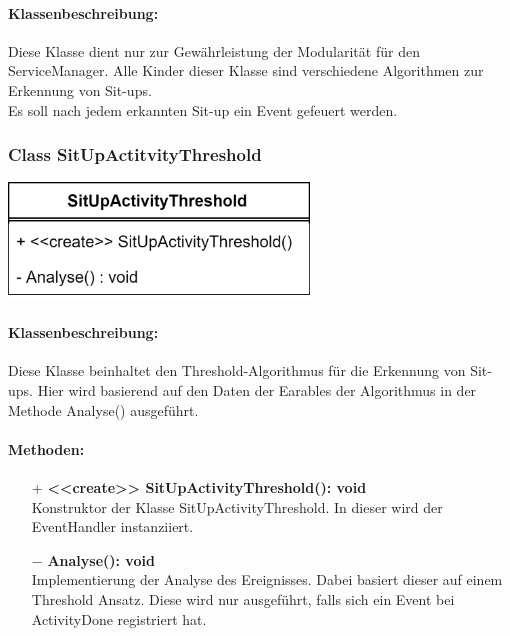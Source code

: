 \documentclass[a4paper,12pt]{article}
\begin{document}
	\paragraph{Klassenbeschreibung:}
	Diese Klasse dient nur zur Gewährleistung der Modularität für den ServiceManager. Alle Kinder dieser Klasse sind verschiedene Algorithmen zur Erkennung von Sit-ups.\\ Es soll nach jedem erkannten Sit-up ein Event gefeuert werden.\\
	\newline
	\begin{minipage}[b]{0.6\textwidth}
		\subsubsection{Class SitUpActitvityThreshold}
		\end{minipage}
		\begin{minipage}[c]{0.5\textwidth}
			\includegraphics[width=0.6\textwidth]{bilder/EMKlassen/SitUpActivityThresholdClass.png}
		\end{minipage}
		
	\paragraph{Klassenbeschreibung:}
	Diese Klasse beinhaltet den Threshold-Algorithmus für die Erkennung von Sit-ups. Hier wird basierend auf den Daten der Earables der Algorithmus in der Methode Analyse() ausgeführt.
	\paragraph{Methoden:}
	\begin{itemize}
		\item [+]\textbf{<<create>> SitUpActivityThreshold(): void}\\Konstruktor der Klasse SitUpActivityThreshold. In dieser wird der EventHandler instanziiert. 
		\item [$-$]\textbf{Analyse(): void}\\ Implementierung der Analyse des Ereignisses. Dabei basiert dieser auf einem Threshold Ansatz. Diese wird nur ausgeführt, falls sich ein Event bei ActivityDone registriert hat.
	\end{itemize}
		
\end{document}
